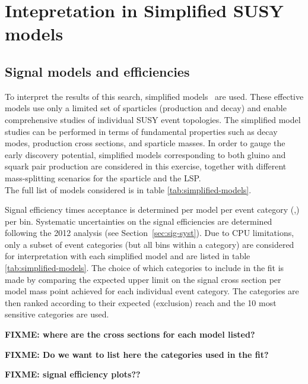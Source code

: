 \section{Intepretation in Simplified SUSY models}
\label{sec:susy}

\subsection{Signal models and efficiencies}
\label{subsec:susy_models}
To interpret the results of this search, simplified
models~\cite{Alwall:2008ag,Alwall:2008va,sms} are used. These
effective models use only a limited set of sparticles (production and
decay) and enable comprehensive studies of individual SUSY event
topologies. The simplified model studies can be performed in terms of
fundamental properties such as decay modes, production cross sections,
and sparticle masses. 
In order to gauge the early discovery potential, simplified models corresponding to both gluino and squark pair production 
are considered in this exercise, together with different mass-splitting scenarios for the sparticle and the LSP. \\  
The full list of models considered is in table \ref{tab:simplified-models}. 

Signal efficiency times acceptance is determined per model per event
category (\njet,\nb) per \HT bin. 
Systematic uncertainties on the signal efficiencies are determined 
following the 2012 analysis (see Section~\ref{sec:sig-syst}). Due to CPU
limitations, only a subset of event categories (but all \scalht bins
within a category) are considered for interpretation with each
simplified model and are listed in table \ref{tab:simplified-models}. 
The choice of which categories to include in the fit 
is made by comparing the expected upper limit on the signal cross section 
per model mass point achieved for each individual event category. 
The categories are then ranked according to their expected (exclusion) reach 
and the 10 most sensitive categories are used. 

\textbf{FIXME: where are the cross sections for each model listed?}

\textbf{FIXME: Do we want to list here the categories used in the fit?}

\textbf{FIXME: signal efficiency plots??}

